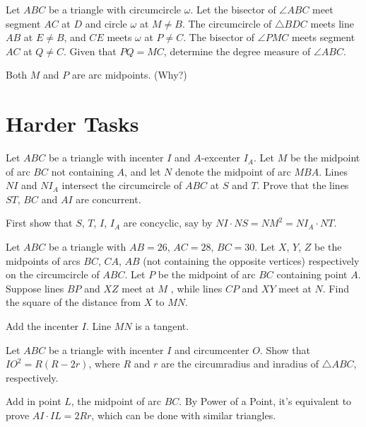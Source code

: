 \documentclass[11pt]{scrartcl}
\begin{document}
\begin{problem}
  Let $ABC$ be a triangle with circumcircle $\omega$.
  Let the bisector of $\angle ABC$ meet segment $AC$ at $D$ and circle $\omega$ at $M\neq B$.
  The circumcircle of $\triangle BDC$ meets line $AB$ at $E \neq B$,
  and $CE$ meets $\omega$ at $P\neq C$.
  The bisector of $\angle PMC$ meets segment $AC$ at $Q \neq C$.
  Given that $PQ = MC$, determine the degree measure of $\angle ABC$.
  \begin{hint}
    Both $M$ and $P$ are arc midpoints. (Why?)
  \end{hint}
\end{problem}


\section{Harder Tasks}
\begin{problem}
  [Iran 2001] Let $ABC$ be a triangle with incenter $I$ and $A$-excenter $I_A$.
  Let $M$ be the midpoint of arc $BC$ not containing $A$, and let $N$ denote the midpoint of arc $MBA$.
  Lines $NI$ and $NI_A$ intersect the circumcircle of $ABC$ at $S$ and $T$.
  Prove that the lines $ST$, $BC$ and $AI$ are concurrent.
  \begin{hint}
    First show that $S$, $T$, $I$, $I_A$ are concyclic, say by $NI \cdot NS = NM^2 = NI_A \cdot NT$.
  \end{hint}
\end{problem}

\begin{problem}
   Let $ABC$ be a triangle with $AB=26$, $AC=28$, $BC=30$.
  Let $X$, $Y$, $Z$ be the midpoints of arcs $BC$, $CA$, $AB$ (not containing the opposite vertices)
  respectively on the circumcircle of $ABC$.
  Let $P$ be the midpoint of arc $BC$ containing point $A$.
  Suppose lines $BP$ and $XZ$ meet at $M$ , while lines $CP$ and $XY$ meet at $N$.
  Find the square of the distance from $X$ to $MN$.
  \begin{hint}
    Add the incenter $I$.
    Line $MN$ is a tangent.
  \end{hint}
\end{problem}

\begin{problem}
  [Euler]
  Let $ABC$ be a triangle with incenter $I$ and circumcenter $O$.
  Show that $IO^2 = R(R-2r)$, where $R$ and $r$ are the circumradius and inradius of $\triangle ABC$,
  respectively.
  \begin{hint}
    Add in point $L$, the midpoint of arc $BC$.
    By Power of a Point, it's equivalent to prove $AI \cdot IL = 2Rr$,
    which can be done with similar triangles.
  \end{hint}
\end{problem}
\end{document}
